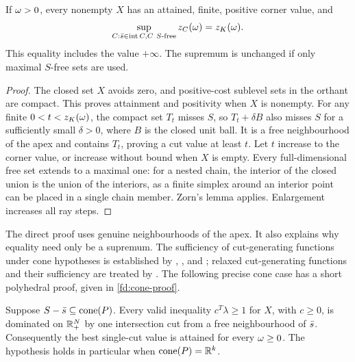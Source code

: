\begin{theorem}\label{fd:single-cut}
If $\omega>0$, every nonempty $X$ has an attained, finite, positive corner
value, and
\[
 \sup_{C:\sbar\in\intt C, C\ S\text{-free}}z_C(\rc)=\zK(\rc).
\]
This equality includes the value $+\infty$. The supremum is unchanged
if only maximal $S$-free sets are used.
\end{theorem}
\begin{proof}
The closed set $X$ avoids zero, and positive-cost sublevel sets in the
orthant are compact. This proves attainment and positivity when $X$ is
nonempty. For any finite $0<t<z_K(\omega)$, the compact set $T_t$ misses
$S$, so $T_t+\delta B$ also misses $S$ for a sufficiently small
$\delta>0$, where $B$ is the closed unit ball. It is a free neighbourhood
of the apex and contains $T_t$, proving a cut value at least $t$.
Let $t$ increase to the corner value, or increase without bound when
$X$ is empty. Every full-dimensional free set extends to a maximal one:
for a nested chain, the interior of the closed union is the union of
the interiors, as a finite simplex around an interior point can be
placed in a single chain member. Zorn's lemma applies. Enlargement
increases all ray steps.
\end{proof}

The direct proof uses genuine neighbourhoods of the apex. It also explains
why equality need only be a supremum. The sufficiency of cut-generating
functions under cone hypotheses is established by
\citet{CWY2015}, \citet{CCDLM2015}, and \citet{KKSteffy2016}; relaxed
cut-generating functions and their sufficiency are treated by
\citet{KKSteffy2016}. The following precise cone case has a short
polyhedral proof, given in \cref{fd:cone-proof}.

\begin{proposition}\label{fd:cone-attainment}
Suppose $S-\bar s\subseteq\operatorname{cone}(P)$. Every valid inequality
$c^T\lambda\ge1$ for $X$, with $c\ge0$, is dominated on $\mathbb R_+^N$ by
one intersection cut from a free neighbourhood of $\bar s$.
Consequently the best single-cut value is attained for every
$\omega\ge0$. The hypothesis holds in particular when $\operatorname{cone}(P)=\mathbb R^k$.
\end{proposition}

